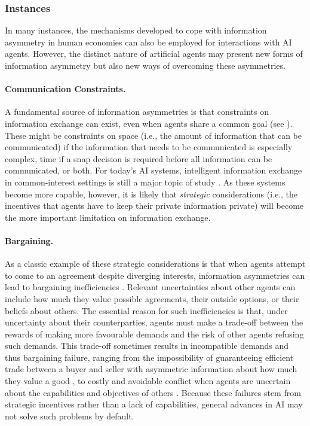\subsubsection{Instances}

In many instances, the mechanisms developed to cope with information asymmetry in human economies can also be employed for interactions with AI agents.
However, the distinct nature of artificial agents may present new forms of information asymmetry but also new ways of overcoming these asymmetries.

\paragraph{Communication Constraints.}
A fundamental source of information asymmetries is that constraints on information exchange can exist, even when agents share a common goal (see ).
These might be constraints on space (i.e., the amount of information that can be communicated) if the information that needs to be communicated is especially complex, time if a snap decision is required before all information can be communicated, or both.
For today's AI systems, intelligent information exchange in common-interest settings is still a major topic of study \citep[see, e.g.,][]{Sukhbaatar2016,Foerster2016,Zhang2018,Lazaridou2020,lauffer_who_2023}.
As these systems become more capable, however, it is likely that \textit{strategic} considerations (i.e., the incentives that agents have to keep their private information private) will become the more important limitation on information exchange.

\paragraph{Bargaining.}
As a classic example of these strategic considerations is that when agents attempt to come to an agreement despite diverging interests, information asymmetries can lead to {bargaining inefficiencies} \citep{myerson1983efficient}.
Relevant uncertainties about other agents can include how much they value possible agreements, their outside options, or their beliefs about others.
The essential reason for such inefficiencies is that, under uncertainty about their counterparties,  agents must make a trade-off between the rewards of making more favourable demands and the risk of other agents refusing such demands.
This trade-off sometimes results in incompatible demands and thus bargaining failure, ranging from the impossibility of guaranteeing efficient trade between a buyer and seller with asymmetric information about how much they value a good \citep{myerson1983efficient}, to costly and avoidable conflict when agents are uncertain about the capabilities and objectives of others \citep{fearon1995rationalist,Slantchev2011-ii}.
Because these failures stem from strategic incentives rather than a lack of capabilities, general advances in AI may not solve such problems by default.


